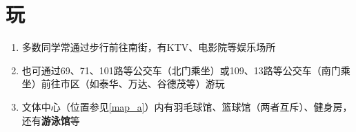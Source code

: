 \section[玩]{玩}
\begin{enumerate}
    \item 多数同学常通过步行前往南街，有KTV、电影院等娱乐场所
    \item 也可通过69、71、101路等公交车（北门乘坐）或109、13路等公交车（南门乘坐）前往市区（如泰华、万达、谷德茂等）游玩
    \item 文体中心（位置参见\uline{\ref{map_a}}）内有羽毛球馆、篮球馆（两者互斥）、健身房，还有\textbf{游泳馆}等\footnotemark
\end{enumerate}